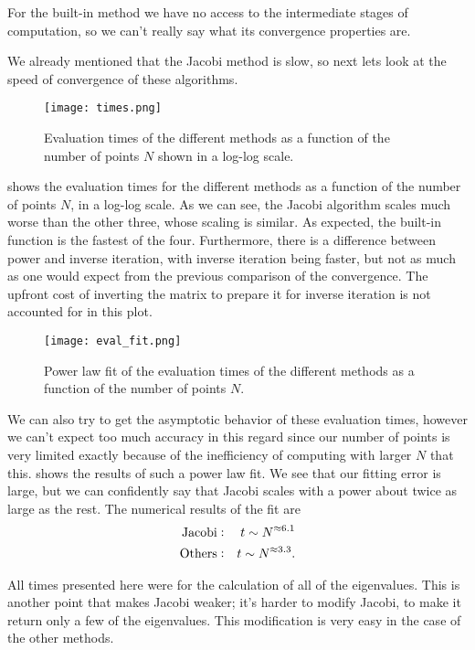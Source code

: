 \documentclass[10pt,a4paper,twocolumn]{article}
\begin{document}
For the built-in method we have no access to the intermediate stages of computation, so we can't really say what its convergence properties are.


We already mentioned that the Jacobi method is slow, so next lets look at the speed of convergence of these algorithms.

\begin{figure}[!hb]
    \centering
    \texttt{[image: times.png]}
    \caption{Evaluation times of the different methods as a function of the number of points $N$ shown in a log-log scale.}
    \label{fig:times}
\end{figure}

 shows the evaluation times for the different methods as a function of the number of points $N$, in a log-log scale. As we can see, the Jacobi algorithm scales much worse than the other three, whose scaling is similar. As expected, the built-in function is the fastest of the four. Furthermore, there is a difference between power and inverse iteration, with inverse iteration being faster, but not as much as one would expect from the previous comparison of the convergence. The upfront cost of inverting the matrix to prepare it for inverse iteration is not accounted for in this plot.

\begin{figure}[!ht]
    \centering
    \texttt{[image: eval\_fit.png]}
    \caption{Power law fit of the evaluation times of the different methods as a function of the number of points $N$.}
    \label{fig:eval_fit}
\end{figure}

We can also try to get the asymptotic behavior of these evaluation times, however we can't expect too much accuracy in this regard since our number of points is very limited exactly because of the inefficiency of computing with larger $N$ that this.  shows the results of such a power law fit. We see that our fitting error is large, but we can confidently say that Jacobi scales with a power about twice as large as the rest. The numerical results of the fit are
%
\begin{align}
    \mathrm{Jacobi:}& &t \sim N^{\approx 6.1}\notag\\
    \mathrm{Others:}& &t \sim N^{\approx 3.3}.
\end{align} 

All times presented here were for the calculation of all of the eigenvalues. This is another point that makes Jacobi weaker; it's harder to modify Jacobi, to make it return only a few of the eigenvalues. This modification is very easy in the case of the other methods.
\end{document}
